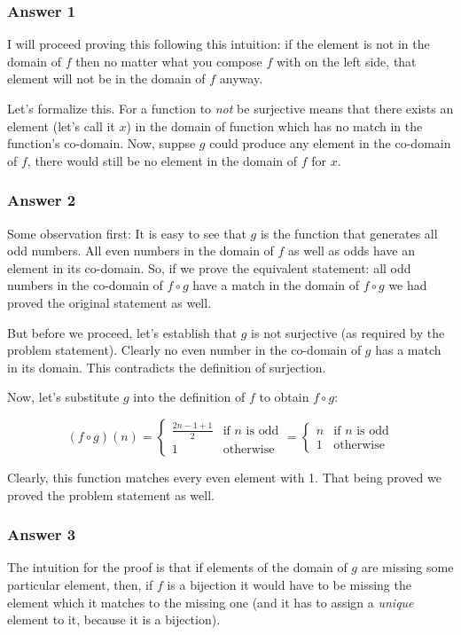 \documentclass[11pt]{article}
\begin{document}
\subsubsection{Answer 1}
\label{sec-1-1-1}
I will proceed proving this following this intuition: if the element is
not in the domain of $f$ then no matter what you compose $f$ with on the
left side, that element will not be in the domain of $f$ anyway.

Let's formalize this.  For a function to \emph{not} be surjective means that
there exists an element (let's call it $x$) in the domain of function
which has no match in the function's co-domain.  Now, suppse $g$ could
produce any element in the co-domain of $f$, there would still be no 
element in the domain of $f$ for $x$.
\subsubsection{Answer 2}
\label{sec-1-1-2}
Some observation first: It is easy to see that $g$ is the function that
generates all odd numbers.  All even numbers in the domain of $f$ as well as
odds have an element in its co-domain.  So, if we prove the equivalent
statement: all odd numbers in the co-domain of $f \circ g$ have a match in
the domain of $f \circ g$ we had proved the original statement as well.

But before we proceed, let's establish that $g$ is not surjective
(as required by the problem statement).  Clearly no even number in the
co-domain of $g$ has a match in its domain.  This contradicts the
definition of surjection.

Now, let's substitute $g$ into the definition of $f$ to obtain $f \circ g$:

\begin{equation*}
  (f \circ g)(n)= \begin{cases}
    \frac{2n-1+1}{2} & \text{if $n$ is odd} \\
    1                & \text{otherwise}
  \end{cases}=\begin{cases}
    n & \text{if $n$ is odd} \\
    1 & \text{otherwise}
  \end{cases}
\end{equation*}

Clearly, this function matches every even element with 1.  That being
proved we proved the problem statement as well.
\subsubsection{Answer 3}
\label{sec-1-1-3}
The intuition for the proof is that if elements of the domain of $g$ are
missing some particular element, then, if $f$ is a bijection it would
have to be missing the element which it matches to the missing one (and
it has to assign a \emph{unique} element to it, because it is a bijection).
\end{document}
